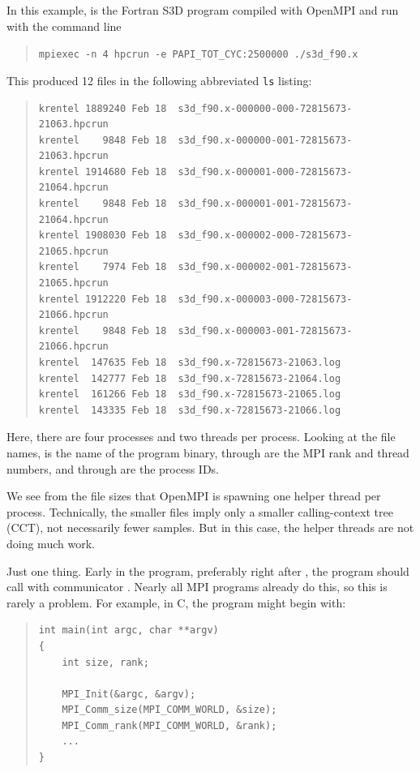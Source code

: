 \documentclass[11pt,letterpaper]{report}
\begin{document}

\answer{}
In this example,  is the Fortran S3D program compiled with OpenMPI and run with the command line
%
\begin{quote}
  \verb|mpiexec -n 4 hpcrun -e PAPI_TOT_CYC:2500000 ./s3d_f90.x|
\end{quote}
%
This produced 12 files in the following abbreviated \texttt{ls} listing:
%
\begin{quote}
\begin{verbatim}
krentel 1889240 Feb 18  s3d_f90.x-000000-000-72815673-21063.hpcrun
krentel    9848 Feb 18  s3d_f90.x-000000-001-72815673-21063.hpcrun
krentel 1914680 Feb 18  s3d_f90.x-000001-000-72815673-21064.hpcrun
krentel    9848 Feb 18  s3d_f90.x-000001-001-72815673-21064.hpcrun
krentel 1908030 Feb 18  s3d_f90.x-000002-000-72815673-21065.hpcrun
krentel    7974 Feb 18  s3d_f90.x-000002-001-72815673-21065.hpcrun
krentel 1912220 Feb 18  s3d_f90.x-000003-000-72815673-21066.hpcrun
krentel    9848 Feb 18  s3d_f90.x-000003-001-72815673-21066.hpcrun
krentel  147635 Feb 18  s3d_f90.x-72815673-21063.log
krentel  142777 Feb 18  s3d_f90.x-72815673-21064.log
krentel  161266 Feb 18  s3d_f90.x-72815673-21065.log
krentel  143335 Feb 18  s3d_f90.x-72815673-21066.log
\end{verbatim}
\end{quote}
%
Here, there are four processes and two threads per process.
Looking at the file names,  is the name of the program binary,  through  are the MPI rank and thread numbers, and  through  are the process IDs.

We see from the file sizes that OpenMPI is spawning one helper thread per process.
Technically, the smaller  files imply only a smaller calling-context tree (CCT), not necessarily fewer samples.
But in this case, the helper threads are not doing much work.



\answer{}
Just one thing.
Early in the program, preferably right after , the program should call  with communicator .
Nearly all MPI programs already do this, so this is rarely a problem.
For example, in C, the program might begin with:
%
\begin{quote}
\begin{verbatim}
int main(int argc, char **argv)
{
    int size, rank;

    MPI_Init(&argc, &argv);
    MPI_Comm_size(MPI_COMM_WORLD, &size);
    MPI_Comm_rank(MPI_COMM_WORLD, &rank);
    ...
}
\end{verbatim}
\end{quote}
\end{document}
